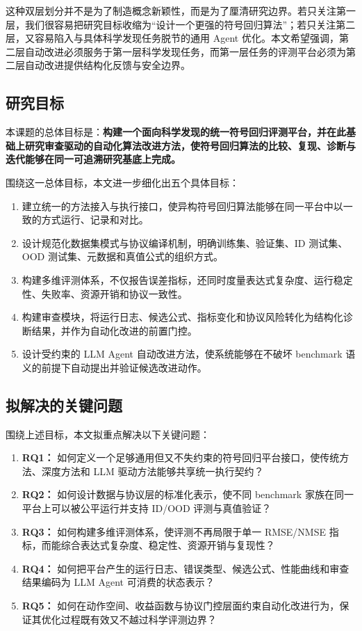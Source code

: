 \documentclass[UTF8,12pt]{ctexart}
\begin{document}
这种双层划分并不是为了制造概念新颖性，而是为了厘清研究边界。若只关注第一层，我们很容易把研究目标收缩为“设计一个更强的符号回归算法”；若只关注第二层，又容易陷入与具体科学发现任务脱节的通用 Agent 优化。本文希望强调，第二层自动改进必须服务于第一层科学发现任务，而第一层任务的评测平台必须为第二层自动改进提供结构化反馈与安全边界。

\subsection{研究目标}

本课题的总体目标是：\textbf{构建一个面向科学发现的统一符号回归评测平台，并在此基础上研究审查驱动的自动化算法改进方法，使符号回归算法的比较、复现、诊断与迭代能够在同一可追溯研究基底上完成。}

围绕这一总体目标，本文进一步细化出五个具体目标：
\begin{enumerate}
    \item 建立统一的方法接入与执行接口，使异构符号回归算法能够在同一平台中以一致的方式运行、记录和对比。
    \item 设计规范化数据集模式与协议编译机制，明确训练集、验证集、ID 测试集、OOD 测试集、元数据和真值公式的组织方式。
    \item 构建多维评测体系，不仅报告误差指标，还同时度量表达式复杂度、运行稳定性、失败率、资源开销和协议一致性。
    \item 构建审查模块，将运行日志、候选公式、指标变化和协议风险转化为结构化诊断结果，并作为自动化改进的前置门控。
    \item 设计受约束的 LLM Agent 自动改进方法，使系统能够在不破坏 benchmark 语义的前提下自动提出并验证候选改进动作。
\end{enumerate}

\subsection{拟解决的关键问题}

围绕上述目标，本文拟重点解决以下关键问题：
\begin{enumerate}
    \item \textbf{RQ1：} 如何定义一个足够通用但又不失约束的符号回归平台接口，使传统方法、深度方法和 LLM 驱动方法能够共享统一执行契约？
    \item \textbf{RQ2：} 如何设计数据与协议层的标准化表示，使不同 benchmark 家族在同一平台上可以被公平运行并支持 ID/OOD 评测与真值验证？
    \item \textbf{RQ3：} 如何构建多维评测体系，使评测不再局限于单一 RMSE/NMSE 指标，而能综合表达式复杂度、稳定性、资源开销与复现性？
    \item \textbf{RQ4：} 如何把平台产生的运行日志、错误类型、候选公式、性能曲线和审查结果编码为 LLM Agent 可消费的状态表示？
    \item \textbf{RQ5：} 如何在动作空间、收益函数与协议门控层面约束自动化改进行为，保证其优化过程既有效又不越过科学评测边界？
\end{enumerate}
\end{document}
